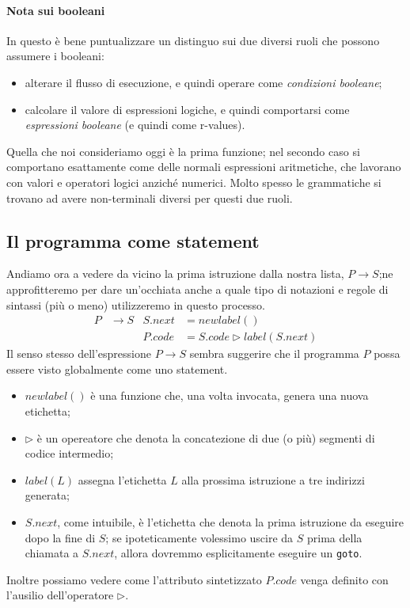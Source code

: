 \documentclass[class=book, crop=false, oneside, 12pt]{standalone}
\begin{document}
\paragraph{Nota sui booleani}
In questo è bene puntualizzare un distinguo sui due diversi ruoli che possono assumere i booleani:
\begin{itemize}
    \item alterare il flusso di esecuzione, e quindi operare come \emph{condizioni booleane};
    \item calcolare il valore di espressioni logiche, e quindi comportarsi come \emph{espressioni booleane} (e quindi come r-values).
\end{itemize}
Quella che noi consideriamo oggi è la prima funzione; nel secondo caso si comportano esattamente come delle normali espressioni aritmetiche, che lavorano con valori e operatori logici anziché numerici. Molto spesso le grammatiche si trovano ad avere non-terminali diversi per questi due ruoli.

\subsection{Il programma come statement}
Andiamo ora a vedere da vicino la prima istruzione dalla nostra lista, \(P \to S\);ne approfitteremo per dare un'occhiata anche a quale tipo di notazioni e regole di sintassi (più o meno) utilizzeremo in questo processo.
\begin{align*}
    P &\to S & S.next &= newlabel() \\
    & & P.code &= S.code \triangleright label(S.next)
\end{align*}
Il senso stesso dell'espressione \(P \to S\) sembra suggerire che il programma \(P\) possa essere visto globalmente come uno statement.
\begin{itemize}
    \item \(newlabel()\) è una funzione che, una volta invocata, genera una nuova etichetta;
    \item \(\triangleright\) è un opereatore che denota la concatezione di due (o più) segmenti di codice intermedio;
    \item \(label(L)\) assegna l'etichetta \(L\) alla prossima istruzione a tre indirizzi generata;
    \item \(S.next\), come intuibile, è l'etichetta che denota la prima istruzione da eseguire dopo la fine di \(S\); se ipoteticamente volessimo uscire da \(S\) prima della chiamata a \(S.next\), allora dovremmo esplicitamente eseguire un \texttt{goto}.
\end{itemize}
Inoltre possiamo vedere come l'attributo sintetizzato \(P.code\) venga definito con l'ausilio dell'operatore \(\triangleright\).
\end{document}
